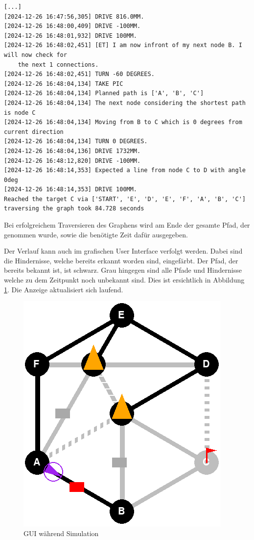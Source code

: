 \begin{footnotesize}
\begin{verbatim}
[...]
[2024-12-26 16:47:56,305] DRIVE 816.0MM.
[2024-12-26 16:48:00,409] DRIVE -100MM.
[2024-12-26 16:48:01,932] DRIVE 100MM.
[2024-12-26 16:48:02,451] [ET] I am now infront of my next node B. I will now check for 
    the next 1 connections.
[2024-12-26 16:48:02,451] TURN -60 DEGREES.
[2024-12-26 16:48:04,134] TAKE PIC
[2024-12-26 16:48:04,134] Planned path is ['A', 'B', 'C']
[2024-12-26 16:48:04,134] The next node considering the shortest path is node C
[2024-12-26 16:48:04,134] Moving from B to C which is 0 degrees from current direction
[2024-12-26 16:48:04,134] TURN 0 DEGREES.
[2024-12-26 16:48:04,136] DRIVE 1732MM.
[2024-12-26 16:48:12,820] DRIVE -100MM.
[2024-12-26 16:48:14,353] Expected a line from node C to D with angle 0deg
[2024-12-26 16:48:14,353] DRIVE 100MM.
Reached the target C via ['START', 'E', 'D', 'E', 'F', 'A', 'B', 'C']
traversing the graph took 84.728 seconds
\end{verbatim}
\end{footnotesize}

Bei erfolgreichem Traversieren des Graphens wird am Ende der gesamte Pfad, der genommen wurde, sowie die benötigte Zeit dafür ausgegeben.

Der Verlauf kann auch im grafischen User Interface verfolgt werden. Dabei sind die Hindernisse, welche bereits erkannt worden sind, eingefärbt. Der Pfad, der bereits bekannt ist, ist schwarz. Grau hingegen sind alle Pfade und Hindernisse welche zu dem Zeitpunkt noch unbekannt sind. Dies ist ersichtlich in Abbildung \ref{fig:simulation-run}.
Die Anzeige aktualisiert sich laufend.

\begin{figure}[H]
    \centering
    \includegraphics[width=0.5\linewidth]{assets//informatik-prototyp//simulator/simulator-run.png}
    \caption{GUI während Simulation}
    \label{fig:simulation-run}
\end{figure}

